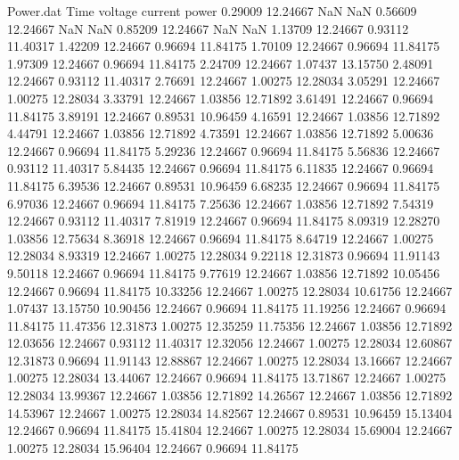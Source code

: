 \begin{filecontents}{Power.dat}
Time voltage current power
   0.29009   12.24667        NaN        NaN
   0.56609   12.24667        NaN        NaN
   0.85209   12.24667        NaN        NaN
   1.13709   12.24667    0.93112   11.40317
   1.42209   12.24667    0.96694   11.84175
   1.70109   12.24667    0.96694   11.84175
   1.97309   12.24667    0.96694   11.84175
   2.24709   12.24667    1.07437   13.15750
   2.48091   12.24667    0.93112   11.40317
   2.76691   12.24667    1.00275   12.28034
   3.05291   12.24667    1.00275   12.28034
   3.33791   12.24667    1.03856   12.71892
   3.61491   12.24667    0.96694   11.84175
   3.89191   12.24667    0.89531   10.96459
   4.16591   12.24667    1.03856   12.71892
   4.44791   12.24667    1.03856   12.71892
   4.73591   12.24667    1.03856   12.71892
   5.00636   12.24667    0.96694   11.84175
   5.29236   12.24667    0.96694   11.84175
   5.56836   12.24667    0.93112   11.40317
   5.84435   12.24667    0.96694   11.84175
   6.11835   12.24667    0.96694   11.84175
   6.39536   12.24667    0.89531   10.96459
   6.68235   12.24667    0.96694   11.84175
   6.97036   12.24667    0.96694   11.84175
   7.25636   12.24667    1.03856   12.71892
   7.54319   12.24667    0.93112   11.40317
   7.81919   12.24667    0.96694   11.84175
   8.09319   12.28270    1.03856   12.75634
   8.36918   12.24667    0.96694   11.84175
   8.64719   12.24667    1.00275   12.28034
   8.93319   12.24667    1.00275   12.28034
   9.22118   12.31873    0.96694   11.91143
   9.50118   12.24667    0.96694   11.84175
   9.77619   12.24667    1.03856   12.71892
  10.05456   12.24667    0.96694   11.84175
  10.33256   12.24667    1.00275   12.28034
  10.61756   12.24667    1.07437   13.15750
  10.90456   12.24667    0.96694   11.84175
  11.19256   12.24667    0.96694   11.84175
  11.47356   12.31873    1.00275   12.35259
  11.75356   12.24667    1.03856   12.71892
  12.03656   12.24667    0.93112   11.40317
  12.32056   12.24667    1.00275   12.28034
  12.60867   12.31873    0.96694   11.91143
  12.88867   12.24667    1.00275   12.28034
  13.16667   12.24667    1.00275   12.28034
  13.44067   12.24667    0.96694   11.84175
  13.71867   12.24667    1.00275   12.28034
  13.99367   12.24667    1.03856   12.71892
  14.26567   12.24667    1.03856   12.71892
  14.53967   12.24667    1.00275   12.28034
  14.82567   12.24667    0.89531   10.96459
  15.13404   12.24667    0.96694   11.84175
  15.41804   12.24667    1.00275   12.28034
  15.69004   12.24667    1.00275   12.28034
  15.96404   12.24667    0.96694   11.84175

\end{filecontents}
